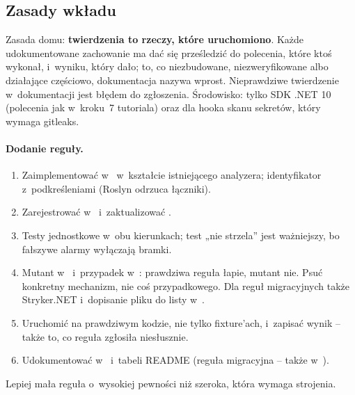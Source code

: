 
\subsection{Zasady wkładu}\label{sec:portcullis-wklad}

Zasada domu: \textbf{twierdzenia to rzeczy, które uruchomiono}. Każde udokumentowane
zachowanie ma dać się prześledzić do polecenia, które ktoś wykonał, i~wyniku, który dało;
to, co niezbudowane, niezweryfikowane albo działające częściowo, dokumentacja nazywa wprost.
Nieprawdziwe twierdzenie w~dokumentacji jest błędem do zgłoszenia. Środowisko: tylko SDK
.NET 10 (polecenia jak w~kroku~7 tutoriala) oraz  dla hooka
skanu sekretów, który wymaga gitleaks.

\paragraph{Dodanie reguły.}
\begin{enumerate}[leftmargin=*]
  \item Zaimplementować w~ w~kształcie istniejącego analyzera;
        identyfikator z~podkreśleniami (Roslyn odrzuca łączniki).
  \item Zarejestrować w~ i~zaktualizować .
  \item Testy jednostkowe w~obu kierunkach; test „nie strzela” jest ważniejszy, bo fałszywe
        alarmy wyłączają bramki.
  \item Mutant w~ i~przypadek w~:
        prawdziwa reguła łapie, mutant nie. Psuć konkretny mechanizm, nie coś
        przypadkowego. Dla reguł migracyjnych także Stryker.NET i~dopisanie pliku do listy
         w~.
  \item Uruchomić na prawdziwym kodzie, nie tylko fixture'ach, i~zapisać wynik -- także to,
        co reguła zgłosiła niesłusznie.
  \item Udokumentować w~ i~tabeli README (reguła migracyjna -- także
        w~).
\end{enumerate}
Lepiej mała reguła o~wysokiej pewności niż szeroka, która wymaga strojenia.

